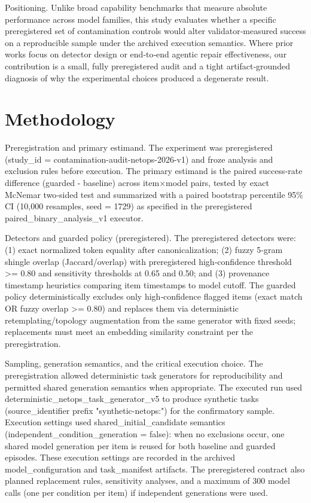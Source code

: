 \documentclass[conference]{IEEEtran}
\begin{document}
Positioning. Unlike broad capability benchmarks that measure absolute performance across model families, this study evaluates whether a specific preregistered set of contamination controls would alter validator‑measured success on a reproducible sample under the archived execution semantics. Where prior works focus on detector design or end‑to‑end agentic repair effectiveness, our contribution is a small, fully preregistered audit and a tight artifact‑grounded diagnosis of why the experimental choices produced a degenerate result.

\section{Methodology}
Preregistration and primary estimand. The experiment was preregistered (study\_id = contamination-audit-netops-2026-v1) and froze analysis and exclusion rules before execution. The primary estimand is the paired success‑rate difference (guarded - baseline) across item\ensuremath{\times}model pairs, tested by exact McNemar two‑sided test and summarized with a paired bootstrap percentile 95\% CI (10,000 resamples, seed = 1729) as specified in the preregistered paired\_binary\_analysis\_v1 executor.

Detectors and guarded policy (preregistered). The preregistered detectors were: (1) exact normalized token equality after canonicalization; (2) fuzzy 5‑gram shingle overlap (Jaccard/overlap) with preregistered high‑confidence threshold >= 0.80 and sensitivity thresholds at 0.65 and 0.50; and (3) provenance timestamp heuristics comparing item timestamps to model cutoff. The guarded policy deterministically excludes only high‑confidence flagged items (exact match OR fuzzy overlap >= 0.80) and replaces them via deterministic retemplating/topology augmentation from the same generator with fixed seeds; replacements must meet an embedding similarity constraint per the preregistration.

Sampling, generation semantics, and the critical execution choice. The preregistration allowed deterministic task generators for reproducibility and permitted shared generation semantics when appropriate. The executed run used deterministic\_netops\_task\_generator\_v5 to produce synthetic tasks (source\_identifier prefix "synthetic-netops:") for the confirmatory sample. Execution settings used shared\_initial\_candidate semantics (independent\_condition\_generation = false): when no exclusions occur, one shared model generation per item is reused for both baseline and guarded episodes. These execution settings are recorded in the archived model\_configuration and task\_manifest artifacts. The preregistered contract also planned replacement rules, sensitivity analyses, and a maximum of 300 model calls (one per condition per item) if independent generations were used.
\end{document}
